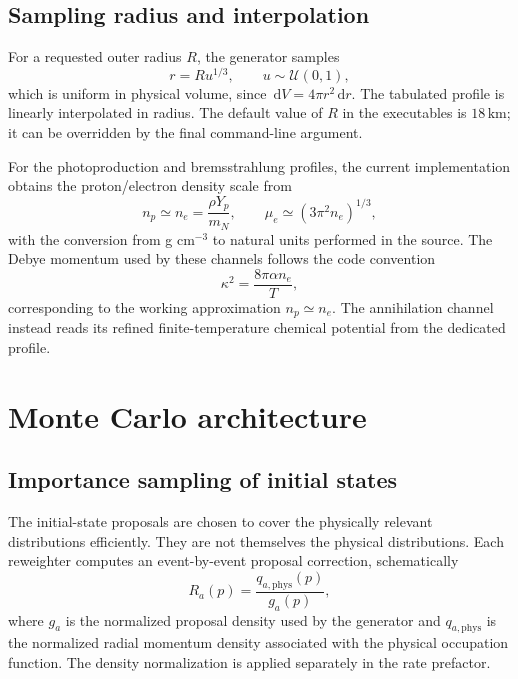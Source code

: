 \documentclass[11pt,a4paper]{article}
\newcommand{\dd}{\,\mathrm{d}}
\begin{document}
\subsection{Sampling radius and interpolation}

For a requested outer radius $R$, the generator samples
\begin{equation}
  r = R u^{1/3}, \qquad u\sim\mathcal{U}(0,1),
\end{equation}
which is uniform in physical volume, since $\dd V=4\pi r^2\dd r$. The tabulated profile is linearly interpolated in radius. The default value of $R$ in the executables is $18\,\mathrm{km}$; it can be overridden by the final command-line argument.

For the photoproduction and bremsstrahlung profiles, the current implementation obtains the proton/electron density scale from
\begin{equation}
 n_p\simeq n_e = \frac{\rho Y_p}{m_N}, \qquad
 \mu_e\simeq (3\pi^2 n_e)^{1/3},
\end{equation}
with the conversion from g cm$^{-3}$ to natural units performed in the source. The Debye momentum used by these channels follows the code convention
\begin{equation}
 \kappa^2 = \frac{8\pi\alpha n_e}{T},
\end{equation}
corresponding to the working approximation $n_p\simeq n_e$. The annihilation channel instead reads its refined finite-temperature chemical potential from the dedicated profile.

\section{Monte Carlo architecture}

\subsection{Importance sampling of initial states}

The initial-state proposals are chosen to cover the physically relevant distributions efficiently. They are not themselves the physical distributions. Each reweighter computes an event-by-event proposal correction, schematically
\begin{equation}
 R_a(p) = \frac{q_{a,\mathrm{phys}}(p)}{g_a(p)},
\end{equation}
where $g_a$ is the normalized proposal density used by the generator and $q_{a,\mathrm{phys}}$ is the normalized radial momentum density associated with the physical occupation function. The density normalization is applied separately in the rate prefactor.
\end{document}
